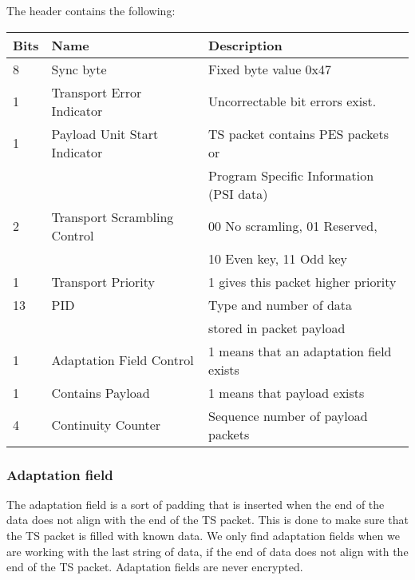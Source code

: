 The header contains the following:
\begin{longtable}{| l | l | l |}
  \hline
  Bits & Name & Description \\ \hline
  8 & Sync byte & Fixed byte value 0x47 \\ \hline
  1 & Transport Error Indicator & Uncorrectable bit errors exist. \\ 
  \hline
  1 & Payload Unit Start Indicator & TS packet contains PES packets or\\
  & & Program Specific Information (PSI data)\\ \hline
  2 & Transport Scrambling Control & 00 No scramling, 01 Reserved, \\
  & & 10 Even key, 11 Odd key \\ \hline
  1 & Transport Priority & 1 gives this packet higher priority \\ \hline
  13 & PID & Type and number of data \\
  & & stored in packet payload \\ \hline
  1 & Adaptation Field Control & 1 means that an adaptation field 
  exists\\ \hline
  1 & Contains Payload & 1 means that payload exists \\ \hline
  4 & Continuity Counter & Sequence number of payload packets\\ \hline
\end{longtable}

\subsubsection{Adaptation field}
The adaptation field is a sort of padding that is inserted when the 
end of the data does not align with the end of the TS packet. This is 
done to make sure that the TS packet is filled with known data. We 
only find adaptation fields when we are working with the last string 
of data, if the end of data does not align with the end of the TS 
packet. Adaptation fields are never encrypted. 
\cite[pp. 10--11]{DVB:2013}

